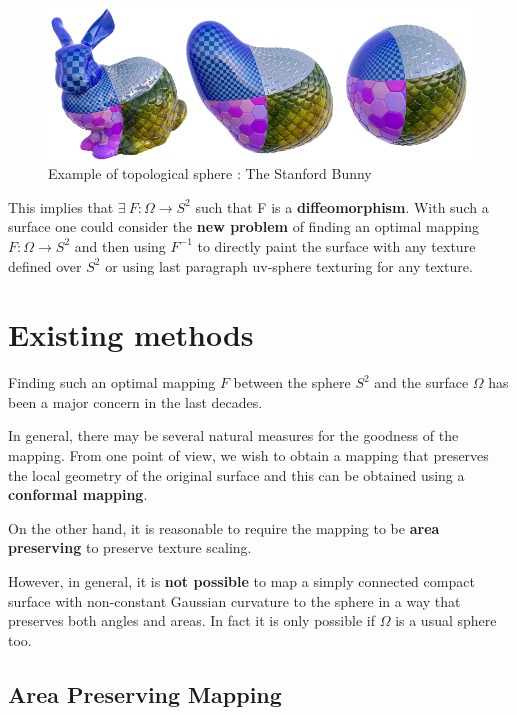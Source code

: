 \documentclass[11pt,a4paper]{article}
\begin{document}
\vskip 0.3cm
\begin{figure}[H]
   \centering
   \includegraphics[width=12cm]{3.png}
   \caption{Example of topological sphere : The Stanford Bunny}
\end{figure}
\vskip 0.3cm

This implies that $\exists\ F : \Omega \to S^2$ such that F is a \textbf{diffeomorphism}.
With such a surface one could consider the \textbf{new problem} of finding an optimal mapping $F : \Omega \to S^2$ and then using $F^{-1}$ to directly paint the surface with any texture defined over $S^2$ or using last paragraph uv-sphere texturing for any texture.

\section{Existing methods}

Finding such an optimal mapping $F$ between the sphere $S^2$ and the surface $\Omega$ has been a major concern in the last decades.

\vskip 0.3cm

In general, there may be several natural measures for the goodness of the mapping. 
From one point of view, we wish to obtain a mapping that preserves the local geometry of the original
surface and this can be obtained using a \textbf{conformal mapping}.

\vskip 0.3cm

On the other hand, it is reasonable to require the mapping to be \textbf{area preserving} to preserve texture scaling.

\vskip 0.3cm

However, in general, it is \textbf{not possible} to map a simply connected compact surface with non-constant Gaussian curvature to the sphere in a way that preserves both angles and areas. In fact it is only possible if $\Omega$ is a usual sphere too.

\subsection{Area Preserving Mapping}
\end{document}
